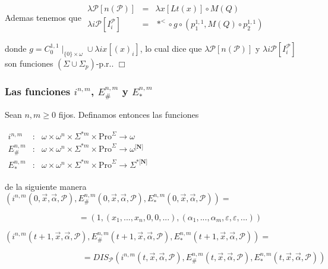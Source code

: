 Ademas tenemos que
\(\displaystyle \begin{array}{rcl} \lambda \mathcal{P}\left[ n(\mathcal{P})\right] & =& \lambda x\left[ Lt(x) \right] \circ M(Q) \\ \lambda i\mathcal{P}\left[ I_{i}^{\mathcal{P}}\right] & =& \ast ^{< }\circ g\circ \left( p_{1}^{1,1},M(Q)\circ p_{2}^{1,1}\right) \end{array} \)

donde \(g=C_{0}^{1,1}\mid _{\{0\}\times \omega }\cup \lambda ix\left[ (x)_{i} \right] \), lo cual dice que \(\lambda \mathcal{P}\left[ n(\mathcal{P})\right] \) y \(\lambda i\mathcal{P}\left[ I_{i}^{\mathcal{P}}\right] \) son funciones \( (\Sigma \cup \Sigma _{p})\)-p.r.. \(\Box\)


\subsubsection{Las funciones \(i^{n,m}\), \(E_{\#}^{n,m}\) y \(E_{\ast }^{n,m}\)}


Sean \(n,m\geq 0\) fijos. Definamos entonces las funciones

\(\displaystyle \begin{array}{rcl} i^{n,m} & :& \omega \times \omega ^{n}\times \Sigma ^{\ast m}\times \mathrm{Pro }^{\Sigma }\rightarrow \omega \\ E_{\#}^{n,m} & :& \omega \times \omega ^{n}\times \Sigma ^{\ast m}\times \mathrm{Pro}^{\Sigma }\rightarrow \omega ^{\lbrack \mathbf{N}]} \\ E_{\ast }^{n,m} & :& \omega \times \omega ^{n}\times \Sigma ^{\ast m}\times \mathrm{Pro}^{\Sigma }\rightarrow \Sigma ^{\ast \lbrack \mathbf{N}]} \end{array} \)

de la siguiente manera
\((i^{n,m}(0,\vec{x},\vec{\alpha},\mathcal{P}),E_{\#}^{n,m}(0,\vec{x},\vec{ \alpha},\mathcal{P}),E_{\ast }^{n,m}(0,\vec{x},\vec{\alpha},\mathcal{P}))=\)

\(\ \ \ \ \ \ \ \ \ \ \ \ \ \ \ \ \ \ \ \ \ \ \ \ \ \ \ \ \ \ \ \ \ \ \ \ \ \ \ \ =(1,(x_{1},...,x_{n},0,0,...),(\alpha _{1},...,\alpha _{m},\varepsilon ,\varepsilon ,...))\)

\((i^{n,m}(t+1,\vec{x},\vec{\alpha},\mathcal{P}),E_{\#}^{n,m}(t+1,\vec{x}, \vec{\alpha},\mathcal{P}),E_{\ast }^{n,m}(t+1,\vec{x},\vec{\alpha},\mathcal{P }))=\)

\(\ \ \ \ \ \ \ \ \ \ \ \ \ \ \ \ \ \ \ \ \ \ \ \ \ \ \ \ \ \ \ \ \ \ \ \ \ \ \ \ \ \ =DIS_{\mathcal{P}}(i^{n,m}(t,\vec{x},\vec{\alpha},\mathcal{P} ),E_{\#}^{n,m}(t,\vec{x},\vec{\alpha},\mathcal{P}),E_{\ast }^{n,m}(t,\vec{x}, \vec{\alpha},\mathcal{P}))\)

